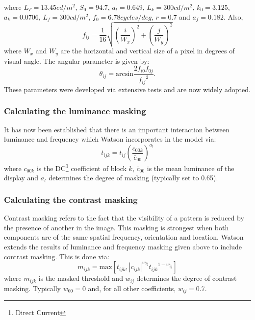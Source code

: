 \documentclass[12pt]{report}
\begin{document}
where $L_{T}=13.45 cd/m^{2}$, $S_{0}=94.7$, $a_{t}=0.649$, $L_{k}=300cd/m^{2}$, $k_{0}=3.125$,
$a_{k}=0.0706$, $L_{f}=300cd/m^{2}$, $f_{0}=6.78cycles/deg$, $r=0.7$ and $a_{f}=0.182$.
Also,
\begin{equation}
f_{ij}=\frac{1}{16}\sqrt{ \left(\frac{i}{W_{x}}\right)^{2}+\left(\frac{j}{W_{y}}\right)^{2} }
\end{equation}
where $W_{x}$ and $W_{y}$ are the horizontal and vertical size of a pixel in degrees of
visual angle. The angular parameter is given by:
\begin{equation}
\theta_{ij}=\mbox{arcsin}\frac{2f_{i0}f_{0j}}{{f_{ij}}^{2}}.
\end{equation}
These parameters were developed via extensive tests and are now widely adopted.

\subsubsection{Calculating the luminance masking}
It has now been established that there is an important interaction between luminance and
frequency which Watson incorporates in the model via:
\begin{equation}
t_{ijk}=t_{ij}\left( \frac{c_{00k}}{\overline{c}_{00}} \right)^{a_{t}}
\end{equation}
where $c_{00k}$ is the DC\footnote{Direct Current} coefficient of block $k$, $\overline{c}_{00}$ is the
mean luminance of the display and $a_{t}$ determines
the degree of masking (typically set to 0.65).

\subsubsection{Calculating the contrast masking}
Contrast masking refers to the fact that the visibility of a pattern is reduced 
by the presence of another in the image. This masking is strongest when 
both components are of the same spatial frequency, orientation and location.
Watson extends the results of luminance and frequency masking given above 
to include contrast masking. This is done via:
\begin{equation}
m_{ijk}=\mbox{max}\left[t_{ijk}, \left|c_{ijk}\right|^{w_{ij}} {t_{ijk}}^{1-w_{ij}}\right]
\end{equation}
where $m_{ijk}$ is the masked threshold and $w_{ij}$ determines the degree of
contrast masking. Typically $w_{00}=0$ and, 
for all other coefficients, 
$w_{ij}=0.7$. 
\end{document}
